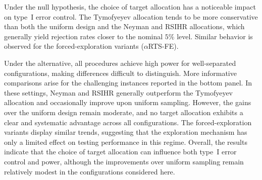 \documentclass[11pt]{article}
\theoremstyle{plain}
\theoremstyle{definition}
\begin{document}
%

Under the null hypothesis, the choice of target allocation has a noticeable
	impact on type~I error control. The Tymofyeyev allocation tends to be more
	conservative than both the uniform design and the Neyman and RSIHR
	allocations, which generally yield rejection rates closer to the nominal
	\(5\%\) level. Similar behavior is observed for the
	forced-exploration variants (\(\alpha\)RTS-FE).
	
	Under the alternative, all procedures achieve high power for well-separated configurations, making differences difficult to distinguish. More informative comparisons arise for the challenging instances reported in the
	bottom panel. In these settings, Neyman and RSIHR generally outperform the Tymofyeyev allocation and occasionally improve upon uniform sampling.
	However, the gains over the uniform design remain moderate, and no target allocation exhibits a clear and systematic advantage across all configurations. The forced-exploration variants display similar trends, suggesting that the exploration mechanism has only a limited effect on testing performance in
	this regime. Overall, the results indicate that the choice of target allocation can influence both type~I error control and power, although the
	improvements over uniform sampling remain relatively modest in the configurations considered here.
\end{document}
